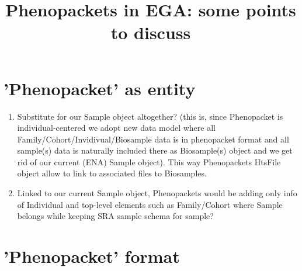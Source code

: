 \documentclass[a4paper, 10pt]{article}        %
\title{Phenopackets in EGA: some points to discuss}
\begin{document}
\date{}
\maketitle


\section{'Phenopacket' as entity}

\begin{enumerate} 
\item Substitute for our Sample object altogether? (this is, since Phenopacket is individual-centered we adopt new data model where all Family/Cohort/Invidivual/Biosample data is in phenopacket format and all sample(s) data is naturally included there as Biosample(s) object and we get rid of our current (ENA) Sample object). This way Phenopackets HtsFile object allow to link to associated files to Biosamples. %

\item Linked to our current Sample object, Phenopackets would be adding only info of Individual and top-level elements such as Family/Cohort where Sample belongs while keeping SRA sample schema for sample?

\end{enumerate}


\section{'Phenopacket' format}
\end{document}

